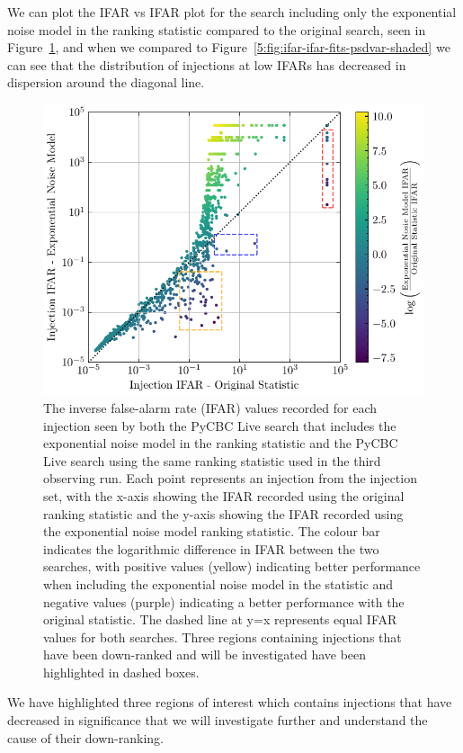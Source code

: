 We can plot the IFAR vs IFAR plot for the search including only the exponential noise model in the ranking statistic compared to the original search, seen in Figure~\ref{5:fig:ifar-ifar-fits-only-regions}, and when we compared to Figure~\ref{5:fig:ifar-ifar-fits-psdvar-shaded} we can see that the distribution of injections at low IFARs has decreased in dispersion around the diagonal line.
% 
\begin{figure}
       \centering
    \includegraphics[width=1.0\textwidth]{images/5_pycbclive/plots/fits_only_ifar_vs_ifar_regions.pdf}
    \caption{The inverse false-alarm rate (IFAR) values recorded for each injection seen by both the PyCBC Live search that includes the exponential noise model in the ranking statistic and the PyCBC Live search using the same ranking statistic used in the third observing run. Each point represents an injection from the injection set, with the x-axis showing the IFAR recorded using the original ranking statistic and the y-axis showing the IFAR recorded using the exponential noise model ranking statistic. The colour bar indicates the logarithmic difference in IFAR between the two searches, with positive values (yellow) indicating better performance when including the exponential noise model in the statistic and negative values (purple) indicating a better performance with the original statistic. The dashed line at y=x represents equal IFAR values for both searches. Three regions containing injections that have been down-ranked and will be investigated have been highlighted in dashed boxes.}
    \label{5:fig:ifar-ifar-fits-only-regions}
\end{figure}
%
We have highlighted three regions of interest which contains injections that have decreased in significance that we will investigate further and understand the cause of their down-ranking.

